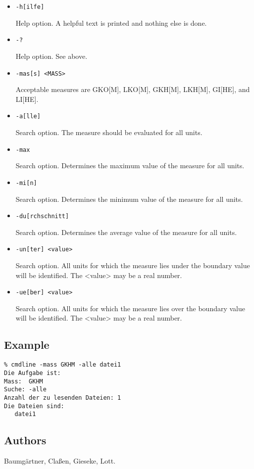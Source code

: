 \begin{itemize}

\item {\tt -h[ilfe] }

Help option.  A helpful text is printed and nothing else is done.

\item {\tt -?}

Help option.  See above.

\item {\tt -mas[s] <MASS>}

Acceptable measures are GKO[M], LKO[M], GKH[M], LKH[M], GI[HE], and LI[HE].

\item {\tt -a[lle]}

Search option.  The measure should be evaluated for all units.

\item {\tt -max}

Search option.  Determines the maximum value of the measure for all
units.

\item {\tt -mi[n]}

Search option.  Determines the minimum value of the measure for all
units.

\item {\tt -du[rchschnitt]}

Search option.  Determines the average value of the measure for all
units.

\item {\tt -un[ter] <value>}

Search option.  All units for which the measure lies under the
boundary value will be identified.
The <value> may be a real number.

\item {\tt -ue[ber] <value>}

Search option.  All units for which the measure lies over the boundary
value will be identified.
The <value> may be a real number.

\end{itemize}


\subsection*{Example}

{\small
\begin{verbatim}
% cmdline -mass GKHM -alle datei1
Die Aufgabe ist:
Mass:  GKHM
Suche: -alle
Anzahl der zu lesenden Dateien: 1
Die Dateien sind:
   datei1
\end{verbatim}
}

\subsection*{Authors}
Baumg\"artner, Cla{\ss}en, Gieseke, Lott.
